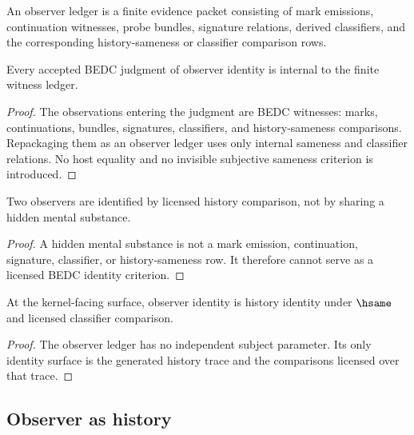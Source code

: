 \begin{definition}
\label{def:philosophy-observer-ledger}
An observer ledger is a finite evidence packet consisting of mark
emissions, continuation witnesses, probe bundles, signature relations,
derived classifiers, and the corresponding history-sameness or
classifier comparison rows.
\end{definition}

\begin{theorem}
\label{thm:philosophy-observer-identity-internal}
Every accepted BEDC judgment of observer identity is internal to the
finite witness ledger.
\end{theorem}
\begin{proof}
The observations entering the judgment are BEDC witnesses: marks,
continuations, bundles, signatures, classifiers, and history-sameness
comparisons. Repackaging them as an observer ledger uses only internal
sameness and classifier relations. No host equality and no invisible
subjective sameness criterion is introduced.
\end{proof}

\begin{corollary}
\label{cor:philosophy-same-observer-not-mental-entity}
Two observers are identified by licensed history comparison, not by
sharing a hidden mental substance.
\end{corollary}
\begin{proof}
A hidden mental substance is not a mark emission, continuation,
signature, classifier, or history-sameness row. It therefore cannot
serve as a licensed BEDC identity criterion.
\end{proof}

\begin{corollary}
\label{cor:philosophy-observer-identity-history-identity}
At the kernel-facing surface, observer identity is history identity
under \(\hsame\) and licensed classifier comparison.
\end{corollary}
\begin{proof}
The observer ledger has no independent subject parameter. Its only
identity surface is the generated history trace and the comparisons
licensed over that trace.
\end{proof}

\subsection{Observer as history}
\label{subsec:philosophy-observer-as-history}

